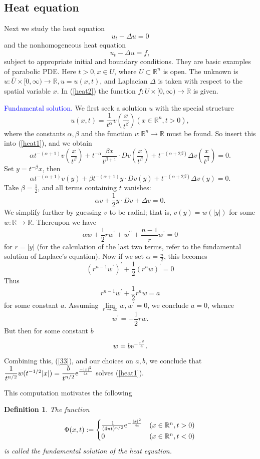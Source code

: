 \documentclass[hyperref,UTF8,12pt]{article}
\numberwithin{equation}{subsection}
\theoremstyle{plain}
\newtheorem{definition}{Definition}
\theoremstyle{definition}
\numberwithin{theorem}{section}
\numberwithin{lemma}{section}
\numberwithin{proposition}{section}
\numberwithin{remark}{section}
\numberwithin{corollary}{section}
\numberwithin{definition}{section}
\numberwithin{problem}{section}
\numberwithin{example}{section}
\def\e{\textup{e}}
\newcommand{\toi}[1]{{#1}\to\infty}
\newcommand{\limls}{\lim\limits}
\newcommand{\mr}{\mathbb{R}}
\begin{document}
\subsection{Heat equation}
Next we study the heat equation{\color{red}\[u_t-\Delta u=0\tag{31}\label{heat1}\]}and the nonhomogeneous heat equation{\color{red}\[u_t-\Delta u=f,\tag{32}\label{heat2}\]}subject to appropriate initial and boundary conditions. They are basic examples of parabolic PDE. Here $t>0,x\in U$, where $U\subset\mr^n$ is open. The unknown is $u:\bar{U}\times[0,\infty) \to\mr,u=u(x,t)$, and Laplacian $\Delta$ is taken with respect to the spatial variable $x$. In (\ref{heat2}) the function $f:U\times[0,\infty)\to\mr$ is given.

\noindent\textcolor{blue}{Fundamental solution.} We first seek a solution $u$ with the special structure\[u(x,t)=\frac{1}{t^\alpha}v\left(\frac{x}{t^\beta}\right)(x\in\mr^n,t>0),\tag{33}\label{33}\]where the constants $\alpha,\beta$ and the function $v:\mr^n\to\mr$ must be found. So insert this into (\ref{heat1}), and we obtain\[
\alpha t^{-(\alpha+1)}v\left(\frac{x}{t^\beta}\right)+ t^{-\alpha}\frac{\beta x}{t^{\beta+1}}\cdot Dv\left(\frac{x}{t^\beta}\right)+t^{-(\alpha+2\beta)}\Delta v\left(\frac{x}{t^\beta}\right)=0.\]Set $y=t^{-\beta}x$, then\[\alpha t^{-(\alpha+1)}v(y)+
\beta t^{-(\alpha+1)}y\cdot Dv(y)+t^{-(\alpha+2\beta)}\Delta v(y)=0.\]Take $\beta=\frac{1}{2}$, and all terms containing $t$ vanishes: \[\alpha v+\frac{1}{2}y\cdot Dv
+\Delta v=0.\]We simplify further by guessing $v$ to be radial; that is, $v(y)=w(|y|)$ for some $w:\mr\to\mr$. Thereupon we have\[\alpha w+\frac{1}{2}rw^\prime+w^{\prime\prime}+
\frac{n-1}{r}w^\prime=0\]for $r=|y|$ (for the calculation of the last two terms, refer to the fundamental solution of Laplace's equation). Now if we set $\alpha=\frac{n}{2}$, this becomes \[(r^{n-1}w^\prime)^\prime+\frac{1}{2}(r^nw)^\prime=0\]Thus
\[r^{n-1}w^\prime+\frac{1}{2}r^nw=a\]for some constant $a$. Assuming $\limls_{\toi{r}}w ,w^\prime=0$, we conclude $a=0$, whence\[w^\prime=-\frac{1}{2}rw.\]But then for some constant $b$\[w=b\e^{-\frac{r^2}{4}}.\]Combining this, (\ref{33}), and our choices on $a,b$, we conclude that $\dfrac{1}{t^{n/2}}w(t^{-1/2}|x|)=\dfrac{b}{t^{n/2}}\e^{\frac{-|x|^2}{4t}}$ solves (\ref{heat1}).

This computation motivates the following
\begin{definition}
The function
\[\Phi(x,t):= \begin{cases}\frac{1}{(4\pi t)^{n/2}}\e^{-\frac{|x|^2}{4t}}&(x\in \mr^n,t>0)\\0&(x\in\mr^n,t<0)\end{cases}\]
is called the \emph{fundamental solution} of the heat equation.
\end{definition}
\end{document}
